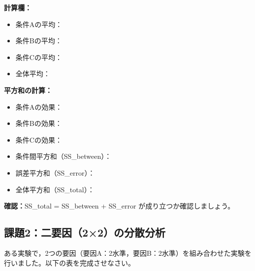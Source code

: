 \documentclass[a4paper,12pt]{ltjarticle}
\begin{document}
\textbf{計算欄：}
\begin{itemize}
	\item[] 条件Aの平均：\underline{\hspace{3cm}}
	\item[] 条件Bの平均：\underline{\hspace{3cm}}
	\item[] 条件Cの平均：\underline{\hspace{3cm}}
	\item[] 全体平均：\underline{\hspace{3cm}}
\end{itemize}

\textbf{平方和の計算：}
\begin{itemize}
	\item[] 条件Aの効果：\underline{\hspace{3cm}}
	\item[] 条件Bの効果：\underline{\hspace{3cm}}
	\item[] 条件Cの効果：\underline{\hspace{3cm}}
	\item[] 条件間平方和（SS\_between）：\underline{\hspace{3cm}}
	\item[] 誤差平方和（SS\_error）：\underline{\hspace{3cm}}
	\item[] 全体平方和（SS\_total）：\underline{\hspace{3cm}}
\end{itemize}

\textbf{確認：}SS\_total = SS\_between + SS\_error が成り立つか確認しましょう。

\newpage

\subsection*{課題2：二要因（2×2）の分散分析}

ある実験で，2つの要因（要因A：2水準，要因B：2水準）を組み合わせた実験を行いました。以下の表を完成させなさい。
\end{document}
